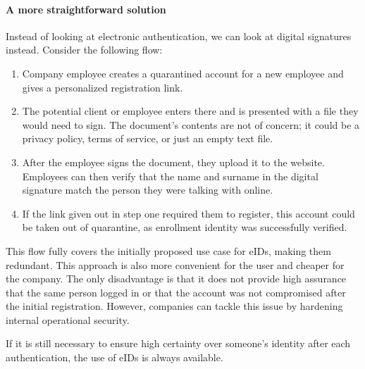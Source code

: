 \paragraph{A more straightforward solution}

Instead of looking at electronic authentication, we can look at digital signatures instead. Consider the following flow:

\begin{enumerate}
    \item Company employee creates a quarantined account for a new employee and gives a personalized registration link.
    \item The potential client or employee enters there and is presented with a file they would need to sign. The document's contents are not of concern; it could be a privacy policy, terms of service, or just an empty text file.
    \item After the employee signs the document, they upload it to the website. Employees can then verify that the name and surname in the digital signature match the person they were talking with online.
    \item If the link given out in step one required them to register, this account could be taken out of quarantine, as enrollment identity was successfully verified.
\end{enumerate}

This flow fully covers the initially proposed use case for eIDs, making them redundant. This approach is also more convenient for the user and cheaper for the company. The only disadvantage is that it does not provide high assurance that the same person logged in or that the account was not compromised after the initial registration. However, companies can tackle this issue by hardening internal operational security.

If it is still necessary to ensure high certainty over someone's identity after each authentication, the use of eIDs is always available.